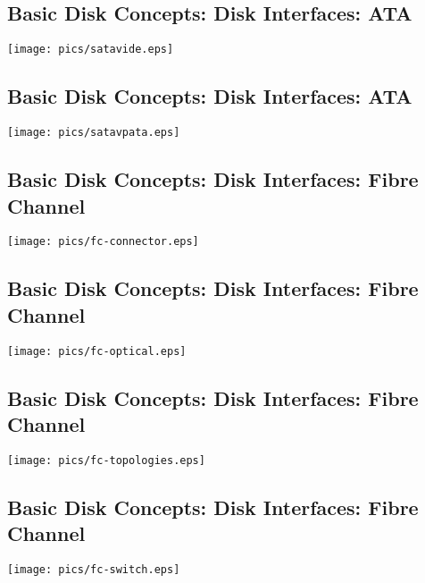 \documentclass[xga]{xdvislides}
\begin{document}
\subsection{Basic Disk Concepts: Disk Interfaces: ATA}
\vfill
	\begin{center}
		\texttt{[image: pics/satavide.eps]} \\
	\end{center}
\vfill

\subsection{Basic Disk Concepts: Disk Interfaces: ATA}
\vfill
	\begin{center}
		\texttt{[image: pics/satavpata.eps]} \\
	\end{center}
\vfill



\subsection{Basic Disk Concepts: Disk Interfaces: Fibre Channel}
\vfill
	\begin{center}
		\texttt{[image: pics/fc-connector.eps]} \\
	\end{center}
\vfill

\subsection{Basic Disk Concepts: Disk Interfaces: Fibre Channel}
\vfill
	\begin{center}
		\texttt{[image: pics/fc-optical.eps]} \\
	\end{center}
\vfill

\subsection{Basic Disk Concepts: Disk Interfaces: Fibre Channel}
\vfill
	\begin{center}
		\texttt{[image: pics/fc-topologies.eps]} \\
	\end{center}
\vfill

\subsection{Basic Disk Concepts: Disk Interfaces: Fibre Channel}
\vfill
	\begin{center}
		\texttt{[image: pics/fc-switch.eps]} \\
	\end{center}
\vfill
\end{document}
